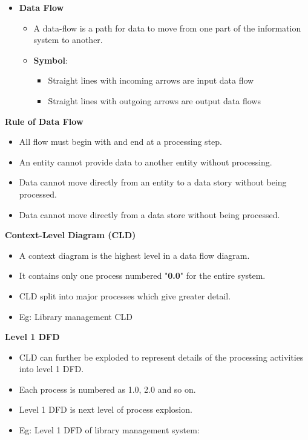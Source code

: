 \begin{flushleft}
\begin{itemize}
		\item \textbf{Data Flow}
		\begin{itemize}
			\item A data-flow is a path for data to move from one part of the information system to another. 
			\item \textbf{Symbol}:
			\begin{itemize}
				\item Straight lines with incoming arrows are input data flow
				\item Straight lines with outgoing arrows are output data flows
			\end{itemize}
		\end{itemize}
		
	\end{itemize}
	
	\newpage
	\textbf{Rule of Data Flow}
	
	\begin{itemize}
		\item All flow must begin with and end at a processing step. 
		\item An entity cannot provide data to another entity without processing.
		\item Data cannot move directly from an entity to a data story without being processed.
		\item Data cannot move directly from a data store without being processed.
		
		
	\end{itemize}
	
	\newpage
	
	\textbf{Context-Level Diagram (CLD)}
	\begin{itemize}
		\item A context diagram is the highest level in a data flow diagram.
		\item It contains only one process numbered "\textbf{0.0}" for the entire system. 
		\item CLD split into major processes which give greater detail.
		\item Eg: Library management CLD
		\bigskip
	\end{itemize}
	\newpage
	\textbf{Level 1 DFD}
	\begin{itemize}
		\item CLD can further be exploded to represent details of the processing activities into level 1 DFD.
		\item Each process is numbered as 1.0, 2.0 and so on.
		\item Level 1 DFD is next level of process explosion.
		\item Eg: Level 1 DFD of library management system:
		\bigskip
	\end{itemize}


\end{flushleft}
